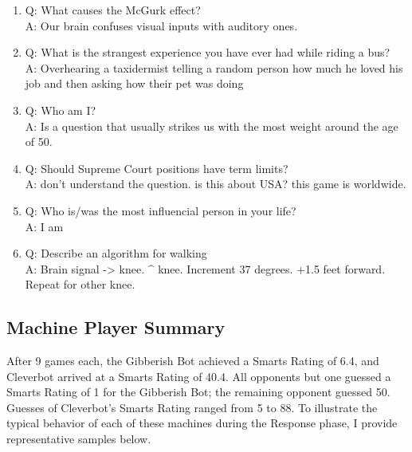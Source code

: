 \begin{enumerate}
\item Q: What causes the McGurk effect?
\\ A: Our brain confuses visual inputs with auditory ones.

\item Q: What is the strangest experience you have ever had while riding a bus?
\\ A: Overhearing a taxidermist telling a random person how much he loved his job and then asking how their pet was doing

\item Q: Who am I?
\\ A: Is a question that usually strikes us with the most weight around the age of 50.

\item Q: Should Supreme Court positions have term limits?
\\ A: don't understand the question. is this about USA? this game is worldwide.

\item Q: Who is/was the most influencial person in your life?
\\ A: I am

\item Q: Describe an algorithm for walking
\\ A: Brain signal -> knee. $\^$ knee. Increment 37 degrees. +1.5 feet forward. Repeat for other knee.
\end{enumerate}

\subsection{Machine Player Summary}

After 9 games each, the Gibberish Bot achieved a Smarts Rating of 6.4, and Cleverbot arrived at a Smarts Rating of 40.4. All opponents but one guessed a Smarts Rating of 1 for the Gibberish Bot; the remaining opponent guessed 50. Guesses of Cleverbot's Smarts Rating ranged from 5 to 88. To illustrate the typical behavior of each of these machines during the Response phase, I provide representative samples below.

